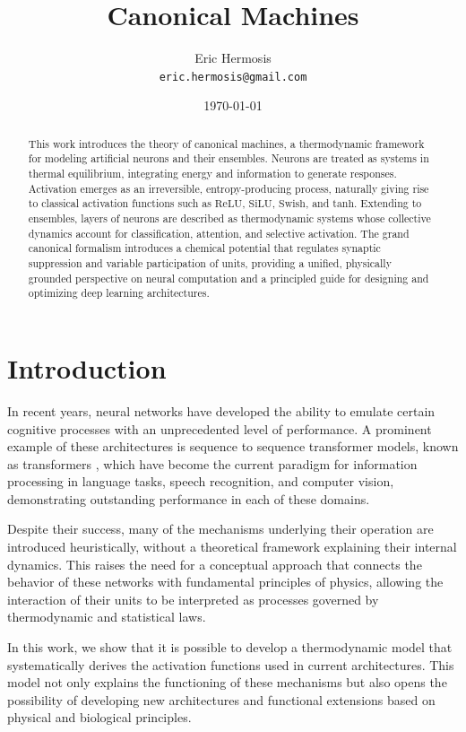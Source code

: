\documentclass[12pt]{article}
\title{Canonical Machines}
\author{Eric Hermosis \\ \texttt{eric.hermosis@gmail.com}}
\date{\today}
\begin{document}
\maketitle

\begin{abstract}
This work introduces the theory of canonical machines, a thermodynamic framework for modeling artificial neurons and their ensembles. Neurons are treated as systems in thermal equilibrium, integrating energy and information to generate responses. Activation emerges as an irreversible, entropy-producing process, naturally giving rise to classical activation functions such as $\text{ReLU}$, $\text{SiLU}$, $\text{Swish}$, and $\text{tanh}$. Extending to ensembles, layers of neurons are described as thermodynamic systems whose collective dynamics account for classification, attention, and selective activation. The grand canonical formalism introduces a chemical potential that regulates synaptic suppression and variable participation of units, providing a unified, physically grounded perspective on neural computation and a principled guide for designing and optimizing deep learning architectures.
\end{abstract}

\section*{Introduction}

In recent years, neural networks have developed the ability to emulate certain cognitive processes with an unprecedented level of performance. A prominent example of these architectures is sequence to sequence transformer models, known as transformers \cite{vaswani2017attention}, which have become the current paradigm for information processing in language tasks, speech recognition, and computer vision, demonstrating outstanding performance in each of these domains.

Despite their success, many of the mechanisms underlying their operation are introduced heuristically, without a theoretical framework explaining their internal dynamics. This raises the need for a conceptual approach that connects the behavior of these networks with fundamental principles of physics, allowing the interaction of their units to be interpreted as processes governed by thermodynamic and statistical laws.

In this work, we show that it is possible to develop a thermodynamic model that systematically derives the activation functions used in current architectures. This model not only explains the functioning of these mechanisms but also opens the possibility of developing new architectures and functional extensions based on physical and biological principles.
\end{document}
